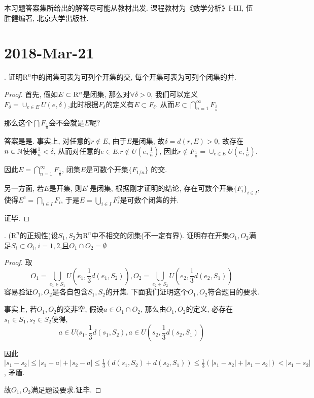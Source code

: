 \documentclass[a4paper,12pt]{article}
\author{龙子超}
\title{{\heiti {\zihao{3} 数学分析II-习题课}}}
\date{}
\begin{document}
\maketitle
%


本习题答案集所给出的解答尽可能从教材出发. 课程教材为《数学分析》I-III, 伍胜健编著,
北京大学出版社.
\section*{2018-Mar-21}
. 证明$\mathrm{R}^n$中的闭集可表为可列个开集的交, 每个开集可表为可列个闭集的并.
\begin{proof}
  首先, 假如$E\subset\mathrm{R}^n$是闭集, 那么对$\forall\delta>0$,
  我们可以定义$F_\delta=\cup_{e\in E}U(e,\delta)$,此时根据$F_\delta$的定义有$E\subset F_\delta$.
  从而$E\subset\bigcap_{n=1}^{\infty}F_{\frac{1}{n}}$
  
  那么这个$\bigcap F_{\frac{1}{n}}$会不会就是$E$呢?

  答案是是. 事实上, 对任意的$r\notin E$, 由于$E$是闭集, 故$\delta=d(r,E)>0$, 
  故存在$n\in\mathbb{N}$使得$\frac{1}{n}<\delta$, 从而对任意的$e\in E$,$r\notin U(e,\frac{1}{n})$,
  因此$r\notin F_{\frac{1}{n}}=\cup_{e\in E}U(e,\frac{1}{n})$.

  因此$E=\bigcap_{n=1}^{\infty}F_{\frac{1}{n}}$, 闭集$E$是可数个开集$\{F_{1/n}\}$
  的交.

  另一方面, 若$E$是开集, 则$E^c$是闭集, 根据刚才证明的结论, 
  存在可数个开集$\{F_i\}_{i\in I}$, 使得$E^c=\bigcap_{i\in I}F_i$, 
  于是$E=\bigcup_{i\in I}F_i^c$是可数个闭集的并.

  证毕.
\end{proof}

. ($\mathrm{R}^n$的正规性)设$S_1,S_2$为$\mathrm{R}^n$中不相交的闭集(不一定有界). 证明存在开集$O_1,O_2$满足$S_i\subset O_i,i=1,2$,且$O_1\cap O_2=\emptyset$
\begin{proof}
  取
  \[O_1=\bigcup_{e_1\in S_1}U(e_1,\frac{1}{3}d(e_1,S_2)),O_2=\bigcup_{e_2\in S_2}U(e_2,\frac{1}{3}d(e_2,S_1))\]
  容易验证$O_1,O_2$是各自包含$S_1,S_2$的开集. 下面我们证明这个$O_1,O_2$符合题目的要求.

  事实上, 若$O_1,O_2$的交非空, 假设$a\in O_1\cap O_2$, 那么由$O_1,O_2$的定义, 
  必存在$s_1\in S_1,s_2\in S_2$使得,
  \[a\in U(s_1,\frac{1}{3}d(s_1,S_2),a\in U(s_2,\frac{1}{3}d(s_2,S_1))\]

  因此$|s_1-s_2|\leq|s_1-a|+|s_2-a|\leq\frac{1}{3}(d(s_1,S_2)+d(s_2,S_1))\leq\frac{1}{3}(|s_1-s_2|+|s_1-s_2|)<|s_1-s_2|$, 
  矛盾.

  故$O_1,O_2$满足题设要求.证毕.
\end{proof}
\end{document}
